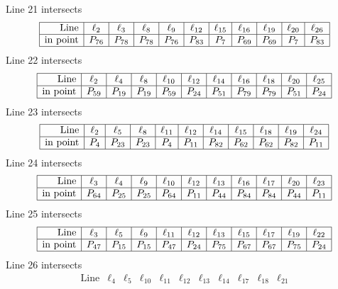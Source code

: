 \documentclass{article}
\begin{document}
{$$$$
Line 21 intersects 
$$
\begin{array}{|r*{10}{|c}|}
\hline
\mbox{Line}  & \ell_{2} & \ell_{3} & \ell_{8} & \ell_{9} & \ell_{12} & \ell_{15} & \ell_{16} & \ell_{19} & \ell_{20} & \ell_{26}\\
\hline
\mbox{in point}  & P_{76} & P_{78} & P_{78} & P_{76} & P_{83} & P_{7} & P_{69} & P_{69} & P_{7} & P_{83}\\
\hline
\end{array}
$$
Line 22 intersects 
$$
\begin{array}{|r*{10}{|c}|}
\hline
\mbox{Line}  & \ell_{2} & \ell_{4} & \ell_{8} & \ell_{10} & \ell_{12} & \ell_{14} & \ell_{16} & \ell_{18} & \ell_{20} & \ell_{25}\\
\hline
\mbox{in point}  & P_{59} & P_{19} & P_{19} & P_{59} & P_{24} & P_{51} & P_{79} & P_{79} & P_{51} & P_{24}\\
\hline
\end{array}
$$
Line 23 intersects 
$$
\begin{array}{|r*{10}{|c}|}
\hline
\mbox{Line}  & \ell_{2} & \ell_{5} & \ell_{8} & \ell_{11} & \ell_{12} & \ell_{14} & \ell_{15} & \ell_{18} & \ell_{19} & \ell_{24}\\
\hline
\mbox{in point}  & P_{4} & P_{23} & P_{23} & P_{4} & P_{11} & P_{82} & P_{62} & P_{62} & P_{82} & P_{11}\\
\hline
\end{array}
$$
Line 24 intersects 
$$
\begin{array}{|r*{10}{|c}|}
\hline
\mbox{Line}  & \ell_{3} & \ell_{4} & \ell_{9} & \ell_{10} & \ell_{12} & \ell_{13} & \ell_{16} & \ell_{17} & \ell_{20} & \ell_{23}\\
\hline
\mbox{in point}  & P_{64} & P_{25} & P_{25} & P_{64} & P_{11} & P_{44} & P_{84} & P_{84} & P_{44} & P_{11}\\
\hline
\end{array}
$$
Line 25 intersects 
$$
\begin{array}{|r*{10}{|c}|}
\hline
\mbox{Line}  & \ell_{3} & \ell_{5} & \ell_{9} & \ell_{11} & \ell_{12} & \ell_{13} & \ell_{15} & \ell_{17} & \ell_{19} & \ell_{22}\\
\hline
\mbox{in point}  & P_{47} & P_{15} & P_{15} & P_{47} & P_{24} & P_{75} & P_{67} & P_{67} & P_{75} & P_{24}\\
\hline
\end{array}
$$
Line 26 intersects 
$$
\begin{array}{|r*{10}{|c}|}
\hline
\mbox{Line}  & \ell_{4} & \ell_{5} & \ell_{10} & \ell_{11} & \ell_{12} & \ell_{13} & \ell_{14} & \ell_{17} & \ell_{18} & \ell_{21}\\

\end{array}$$}
\end{document}
